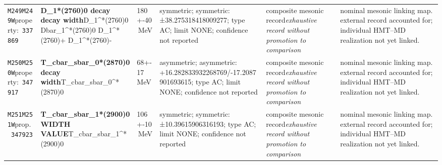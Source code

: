 \begin{landscape}
\begin{longtable}{L{1.85cm}L{4.45cm}L{2.35cm}L{4.05cm}L{3.35cm}L{7.15cm}}
\texttt{M249}\newline \texttt{M249W}\newline property:\ \texttt{337869} & \textbf{D\_\allowbreak{}1*(2760)0 decay decay width}\newline D\_\allowbreak{}1\textasciicircum{}*(2760)0 \textbar{}\allowbreak{} Dbar\_\allowbreak{}1\textasciicircum{}*(2760)0 \textbar{}\allowbreak{} D\_\allowbreak{}1\textasciicircum{}*(2760)+ \textbar{}\allowbreak{} D\_\allowbreak{}1\textasciicircum{}*(2760)- & 180+-40\,MeV & symmetric; symmetric: ±38.275318418009277; type AC; limit NONE; confidence not reported & composite mesonic record\newline \emph{exhaustive record without promotion to comparison} & nominal mesonic linking map. external record accounted for; individual HMT--MD realization not yet linked. \\
\texttt{M250}\newline \texttt{M250W}\newline property:\ \texttt{347917} & \textbf{T\_\allowbreak{}cbar\_\allowbreak{}sbar\_\allowbreak{}0*(2870)0 decay width}\newline T\_\allowbreak{}cbar\_\allowbreak{}sbar\_\allowbreak{}0\textasciicircum{}*(2870)0 & 68+-17\,MeV & asymmetric; asymmetric: +16.282833932268769/-17.2087901693615; type AC; limit NONE; confidence not reported & composite mesonic record\newline \emph{exhaustive record without promotion to comparison} & nominal mesonic linking map. external record accounted for; individual HMT--MD realization not yet linked. \\
\texttt{M251}\newline \texttt{M251W}\newline prop.\ \texttt{347923} & \textbf{T\_\allowbreak{}cbar\_\allowbreak{}sbar\_\allowbreak{}1*(2900)0 WIDTH VALUE}\newline T\_\allowbreak{}cbar\_\allowbreak{}sbar\_\allowbreak{}1\textasciicircum{}*(2900)0 & 106+-10\,MeV & symmetric; symmetric: ±10.39615906316193; type AC; limit NONE; confidence not reported & composite mesonic record\newline \emph{exhaustive record without promotion to comparison} & nominal mesonic linking map. external record accounted for; individual HMT--MD realization not yet linked. \\

\end{longtable}
\end{landscape}
